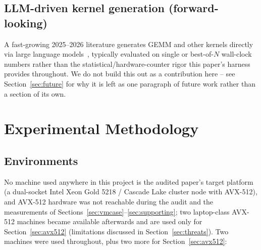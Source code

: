 \documentclass[acmsmall]{acmart}
\begin{document}
\subsection{LLM-driven kernel generation (forward-looking)}
A fast-growing 2025--2026 literature generates GEMM and other kernels
directly via large language models~\cite{qimenggemm2025,llmkernelsurvey2026},
typically evaluated on single or best-of-$N$ wall-clock numbers rather
than the statistical/hardware-counter rigor this paper's harness
provides throughout. We do not build this out as a contribution here --
see Section~\ref{sec:future} for why it is left as one paragraph of
future work rather than a section of its own.

\section{Experimental Methodology}
\label{sec:methodology}

\subsection{Environments}
\label{sec:environments}

No machine used anywhere in this project is the audited paper's target
platform (a dual-socket Intel Xeon Gold 5218 / Cascade Lake cluster
node with AVX-512), and AVX-512 hardware was not reachable during the
audit and the measurements of Sections~\ref{sec:vmcase}--\ref{sec:supporting};
two laptop-class AVX-512 machines became available afterwards and are
used only for Section~\ref{sec:avx512} (limitations discussed in
Section~\ref{sec:threats}). Two machines were used throughout, plus two
more for Section~\ref{sec:avx512}:
\end{document}
